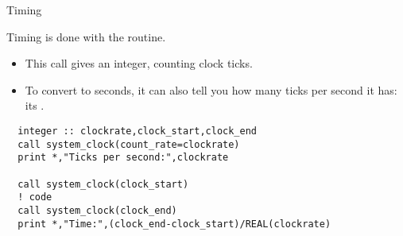 
 {Timing}

Timing is done with the  routine.
\begin{itemize}
\item This call gives an integer, counting clock ticks.
\item To convert to seconds, it can also tell you how many ticks per
  second it has: its .
\end{itemize}

\begin{lstlisting}
  integer :: clockrate,clock_start,clock_end
  call system_clock(count_rate=clockrate)
  print *,"Ticks per second:",clockrate

  call system_clock(clock_start)
  ! code
  call system_clock(clock_end)
  print *,"Time:",(clock_end-clock_start)/REAL(clockrate)
\end{lstlisting}
